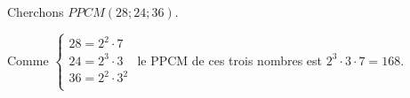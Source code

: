             \begin{ex}
                  Cherchons $PPCM(28;24;36)$.
                  
                  Comme 
                  $
                  \left\lbrace
                  \begin{array}{l}
                        28 = 2^2 \cdot 7 \\
                        24 = 2^3 \cdot 3 \\
                        36 = 2^2 \cdot 3^2 \\
                  \end{array}
                  \right.
                  $
                  le PPCM de ces trois nombres est $2^3 \cdot 3 \cdot 7 = 168$.
            \end{ex}

